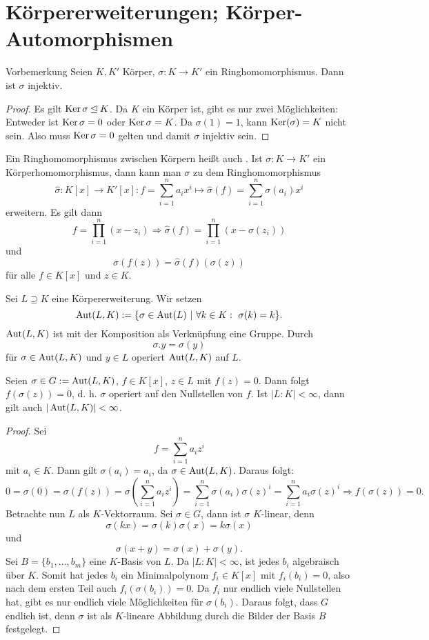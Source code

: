 \section{Körpererweiterungen; Körper-Automorphismen}

\begin{genericdf}{Vorbemerkung}\label{skript:14.1}
	Seien $K,K'$ Körper,  $\sigma:K \to K'$ ein Ringhomomorphismus. Dann ist $\sigma$ injektiv.
	\begin{proof}
	Es gilt $\operatorname{Ker}\sigma\unlhd K$. Da $K$ ein Körper ist, gibt es nur zwei Möglichkeiten: Entweder ist $\operatorname{Ker}\sigma=0$ oder $\operatorname{Ker}\sigma=K$. Da $\sigma(1)=1$, kann $\operatorname{Ker}(	\sigma)=K$ nicht sein. Also muss $\operatorname{Ker}\sigma=0$ gelten und damit $\sigma$ injektiv sein.
	\end{proof}
	Ein Ringhomomorphismus zwischen Körpern heißt auch . Ist $\sigma: K \to K'$ ein Körperhomomorphismus, dann kann man $\sigma$ zu dem Ringhomomorphismus 
	\[\hat{\sigma}: K[x] \to K'[x]: f=\sum_{i=1}^n a_i x^{i} \mapsto \hat{\sigma}(f)=\sum_{i=1}^n \sigma (a_i) x^{i}\]
	erweitern. Es gilt dann
	\[f=\prod_{i=1}^n (x-z_i) \Rightarrow \hat{\sigma}(f)=\prod_{i=1}^n (x-\sigma(z_i))\]
	und
	\[\sigma(f(z))= \hat{\sigma}(f)(\sigma(z))\]
	für alle $f \in K[x]$ und $z \in K$.
\end{genericdf}

\begin{df}\label{skript:14.2} 
	Sei $L\supseteq K$ eine Körpererweiterung. Wir setzen
	\[\operatorname{Aut}(L,K):=\{ \sigma \in \operatorname{Aut}(L) \ | \  \forall k \in K: \ \sigma(k)=k \}.\]
	$\operatorname{Aut}(L,K)$ ist mit der Komposition als Verknüpfung eine Gruppe. Durch
	\[\sigma.y = \sigma(y)\]
	für $\sigma \in \operatorname{Aut}(L,K)$ und $y \in L$ operiert $\operatorname{Aut}(L,K)$ auf $L$.
\end{df}

\begin{lemma}\label{skript:14.3} 
	Seien $\sigma \in G:=\operatorname{Aut} (L,K)$, $f \in K[x]$, $z \in L$ mit $ f(z)=0$. Dann folgt $f(\sigma(z))=0$, d. h. $\sigma$ operiert auf den Nullstellen von $f$. Ist $|L:K| < \infty$, dann gilt auch $|\operatorname{Aut} (L,K)| < \infty$.
\end{lemma}
\begin{proof}
	Sei
	\[f=\sum_{i=1}^n a_iz^i\]
	mit $a_i\in K$. Dann gilt $\sigma(a_i)=a_i$, da $\sigma\in\operatorname{Aut}(L,K)$. Daraus folgt:
	\[0=\sigma(0)=\sigma(f(z))=\sigma(\sum_{i=1}^n a_iz^i)=\sum_{i=1}^n \sigma(a_i) \sigma(z)^i=\sum_{i=1}^n a_i \sigma(z)^i \Rightarrow f(\sigma(z))=0.\]
	Betrachte nun $L$ als $K$-Vektorraum. Sei $\sigma \in G$, dann ist $\sigma$ $K$-linear, denn
	\[\sigma(kx)=\sigma(k) \sigma(x)=k \sigma(x)\]
	und
	\[\sigma(x+y)=\sigma(x)+\sigma(y).\]
	Sei $B=\{b_1,...,b_m\}$ eine $K$-Basis von $L$. Da $|L:K|< \infty$, ist jedes $b_i$ algebraisch über $K$. Somit hat jedes $b_i$ ein Minimalpolynom $f_i \in K[x]$ mit $f_i(b_i)=0$, also nach dem ersten Teil auch $f_i(\sigma(b_i))=0$. Da $f_i$ nur endlich viele Nullstellen hat, gibt es nur endlich viele Möglichkeiten für $\sigma(b_i)$. Daraus folgt, dass $G$ endlich ist, denn $\sigma$ ist als $K$-lineare Abbildung durch die Bilder der Basis $B$ festgelegt.
\end{proof}

